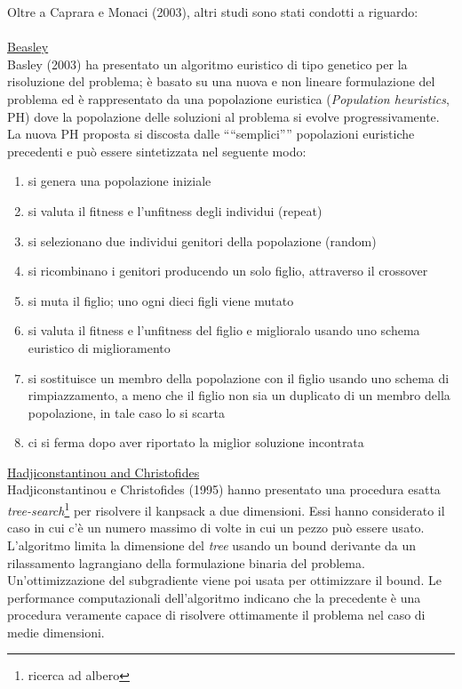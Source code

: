 \documentclass[12pt,a4paper,openright,twoside]{report}
\begin{document}
Oltre a Caprara e Monaci (2003), altri studi sono stati condotti a riguardo:\\
\\
\underline{Beasley}\\
Basley (2003) ha presentato un algoritmo euristico di tipo genetico per la risoluzione del problema; \`{e} basato su una nuova e non lineare formulazione del problema ed \`{e} rappresentato da una popolazione euristica (\textit{Population heuristics}, PH) dove la popolazione delle soluzioni al problema si evolve progressivamente. La nuova PH proposta si discosta dalle "`"`semplici"'"' popolazioni euristiche precedenti e pu\`{o} essere sintetizzata nel seguente modo:
\begin{enumerate}
\item si genera una popolazione iniziale
\item si valuta il fitness e l'unfitness degli individui (repeat)
\item si selezionano due individui genitori della popolazione (random)
\item si ricombinano i genitori producendo un solo figlio, attraverso il crossover
\item si muta il figlio; uno ogni dieci figli viene mutato
\item si valuta il fitness e l'unfitness del figlio e miglioralo usando uno schema euristico di miglioramento
\item si sostituisce un membro della popolazione con il figlio usando uno schema di rimpiazzamento, a meno che il figlio non sia un duplicato di un membro della popolazione, in tale caso lo si scarta
\item ci si ferma dopo aver riportato la miglior soluzione incontrata\\
\end{enumerate}
\underline{Hadjiconstantinou and Christofides}\\
Hadjiconstantinou e Christofides (1995) hanno presentato una procedura esatta \textit{tree-search}\footnote{ricerca ad albero} per risolvere il kanpsack a due dimensioni. Essi hanno considerato il caso in cui c'\`{e} un numero massimo di volte in cui un pezzo pu\`{o} essere usato. L'algoritmo limita la dimensione del \textit{tree} usando un bound derivante da un rilassamento lagrangiano della formulazione binaria del problema. Un'ottimizzazione del subgradiente viene poi usata per ottimizzare il bound. Le performance computazionali dell'algoritmo indicano che la precedente \`{e} una  procedura veramente capace di risolvere ottimamente il problema nel caso di medie dimensioni.\\
\end{document}
